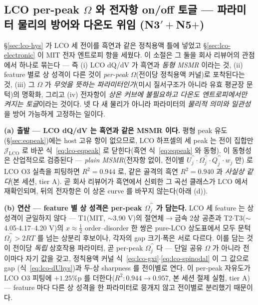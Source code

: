 \subsection{LCO per-peak $\Omega$ 와 전자항 on/off 토글 --- 파라미터 물리의 방어와 다온도 위임 (N3$'\!+$N5$+$)}\label{ssec:lco-omega}
\S\ref{sec:lco-hys} 가 LCO 세 전이를 흑연과 같은 정칙용액 틀에 넣었고 \S\ref{sec:lco-electronic} 이 MIT 전자
엔트로피 항을 세웠다. 이 소절은 그 둘을 회사 리뷰어의 관점에서 하나로 묶는다 --- 즉 (i) LCO dQ/dV 가 흑연과
\emph{동형 MSMR} 이라는 것, (ii) feature 별로 상 성격이 다른 것이 \emph{per-peak $\Omega$}(전이당 정칙용액 커널)로
포착된다는 것, (iii) 그 $\Omega$ 가 \emph{무엇을 뜻하는 파라미터인가}(미시 질서구조가 아니라 유효 평균장 문턱)의
명확화, 그리고 (iv) 전자항이 \emph{상온 커브에 불필요하고 다온도 엔트로피에서만 켜지는 토글}이라는 것이다. 넷 다
새 물리가 아니라 파라미터의 \emph{물리적 의미와 일관성}을 방어 가능하게 고정하는 일이다.

\textbf{(a) 출발 --- LCO dQ/dV 는 흑연과 같은 MSMR 이다.} 평형 peak 유도(\S\ref{sec:eqpeak})에는 host 고유 항이
없으므로, LCO 하프셀의 세 peak 는 전이 집합만 $\mathcal J_\mathrm{LCO}$ 로 바꾼 식~\eqref{eq:lco-eqpeak} 로
닫힌다(흑연 식~\eqref{eq:eqpeak} 와 동형). 이 동형성은 산업적으로 검증된다 --- \emph{plain MSMR}(전자항 없이,
전이별 $U_j^\cat\cdot\Omega_j^\cat\cdot Q_j^\cat\cdot w_j$ 만) 로 LCO O3 실측을 피팅하면 $R^2=0.944$ 로, 같은
골격의 흑연 $R^2=0.940$ 과 \emph{사실상 같다}(본 세션, tier A). 곧 회사 리뷰어가 흑연에서 신뢰한 그 곡선 클래스가
LCO 에서 재확인되며, 뒤의 전자항은 이 상온 curve 를 바꾸지 않는다(아래 (d)).

\textbf{(b) 연산 --- feature 별 상 성격은 per-peak $\Omega_j^\cat$ 가 담는다.} LCO 세 feature 는 상 성격이 균일하지
않다 --- T1(MIT, $\sim$3.90 V)의 절연체$\to$금속 2상 공존과 T2$\cdot$T3($\sim$4.05$\cdot$4.17--4.20 V)의
$x\!\approx\!\tfrac12$ order--disorder 한 쌍은 pure-LCO 상도표에서 모두 문턱 $\Omega_j^\cat>2RT$ 를 넘는 상분리
후보이나\cite{reimers1992,vanderven1998,motohashi2009}, 각자의 gap 크기$\cdot$폭은 서로 다르다. 이를 담는 것이
전이당 \emph{독립} 상호작용 파라미터, 곧 per-peak $\Omega_j^\cat$ 다 --- 단일 공유 $\Omega$ 가 아니라 전이마다
자기 값을 갖고, 정칙용액 커널 식~\eqref{eq:lco-gxi}$\cdot$\eqref{eq:lco-spinodal} 이 그 값으로 gap
(식~\eqref{eq:lco-dUhys})과 두-상 sharpness 를 전이별로 연다. 이 per-peak 자유도가 LCO O3 피팅에 $+1.25$\%p 를
더한다($R^2:0.944\to0.957$, 본 세션 절제 실험, tier A) --- feature 마다 다른 상 성격을 한 파라미터로 뭉개지 않고
전이별로 분리했기 때문이다.

